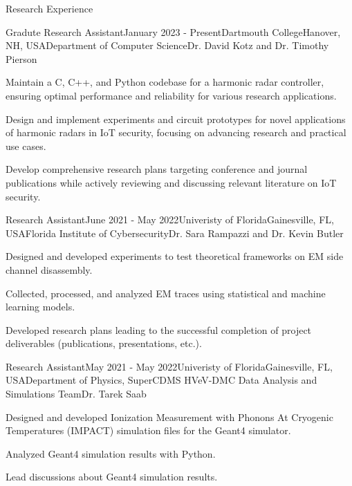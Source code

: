 \documentclass{resume} %
\begin{document}
\begin{rSection}{Research Experience}
  \begin{rSubsection_ra}{Gradute Research Assistant}{January 2023 - Present}{Dartmouth College}{Hanover, NH, USA}{Department of Computer Science}{Dr. David Kotz and Dr. Timothy Pierson}
    \item Maintain a C, C++, and Python codebase for a harmonic radar controller, ensuring optimal performance and reliability for various research applications. 
    \item Design and implement experiments and circuit prototypes for novel applications of harmonic radars in IoT security, focusing on advancing research and practical use cases.
    \item Develop comprehensive research plans targeting conference and journal publications while actively reviewing and discussing relevant literature on IoT security.
  \end{rSubsection_ra}
  \begin{rSubsection_ra}{Research Assistant}{June 2021 - May 2022}{Univeristy of Florida}{Gainesville, FL, USA}{Florida Institute of Cybersecurity}{Dr. Sara Rampazzi and Dr. Kevin Butler}
  \item Designed and developed experiments to test theoretical frameworks on EM side channel disassembly.
  \item Collected, processed, and analyzed EM traces using statistical and machine learning models.
  \item Developed research plans leading to the successful completion of project deliverables (publications, presentations, etc.).
  \end{rSubsection_ra}
  \begin{rSubsection_ra}{Research Assistant}{May 2021 - May 2022}{Univeristy of Florida}{Gainesville, FL, USA}{Department of Physics, SuperCDMS HVeV-DMC Data Analysis and Simulations Team}{Dr. Tarek Saab}
  \item Designed and developed Ionization Measurement with Phonons At Cryogenic Temperatures (IMPACT) simulation files for the Geant4 simulator.
  \item Analyzed Geant4 simulation results with Python.
  \item Lead discussions about Geant4 simulation results. 
  \end{rSubsection_ra}


\end{rSection}
\end{document}
